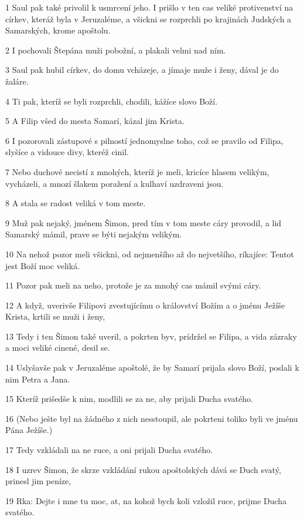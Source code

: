 \par 1 Saul pak také privolil k usmrcení jeho. I prišlo v ten cas veliké protivenství na církev, kteráž byla v Jeruzaléme, a všickni se rozprchli po krajinách Judských a Samarských, krome apoštolu.
\par 2 I pochovali Štepána muži pobožní, a plakali velmi nad ním.
\par 3 Saul pak hubil církev, do domu vcházeje, a jímaje muže i ženy, dával je do žaláre.
\par 4 Ti pak, kteríž se byli rozprchli, chodili, kážíce slovo Boží.
\par 5 A Filip všed do mesta Samarí, kázal jim Krista.
\par 6 I pozorovali zástupové s pilností jednomyslne toho, což se pravilo od Filipa, slyšíce a vidouce divy, kteréž cinil.
\par 7 Nebo duchové necistí z mnohých, kteríž je meli, kricíce hlasem velikým, vycházeli, a mnozí šlakem poražení a kulhaví uzdraveni jsou.
\par 8 A stala se radost veliká v tom meste.
\par 9 Muž pak nejaký, jménem Šimon, pred tím v tom meste cáry provodil, a lid Samarský mámil, prave se býti nejakým velikým.
\par 10 Na nehož pozor meli všickni, od nejmenšího až do nejvetšího, ríkajíce: Tentot jest Boží moc veliká.
\par 11 Pozor pak meli na neho, protože je za mnohý cas mámil svými cáry.
\par 12 A když, uverivše Filipovi zvestujícímu o království Božím a o jménu Ježíše Krista, krtili se muži i ženy,
\par 13 Tedy i ten Šimon také uveril, a pokrten byv, prídržel se Filipa, a vida zázraky a moci veliké cinené, desil se.
\par 14 Uslyšavše pak v Jeruzaléme apoštolé, že by Samarí prijala slovo Boží, poslali k nim Petra a Jana.
\par 15 Kteríž prišedše k nim, modlili se za ne, aby prijali Ducha svatého.
\par 16 (Nebo ješte byl na žádného z nich nesstoupil, ale pokrteni toliko byli ve jménu Pána Ježíše.)
\par 17 Tedy vzkládali na ne ruce, a oni prijali Ducha svatého.
\par 18 I uzrev Šimon, že skrze vzkládání rukou apoštolských dává se Duch svatý, prinesl jim peníze,
\par 19 Rka: Dejte i mne tu moc, at, na kohož bych koli vzložil ruce, prijme Ducha svatého.
